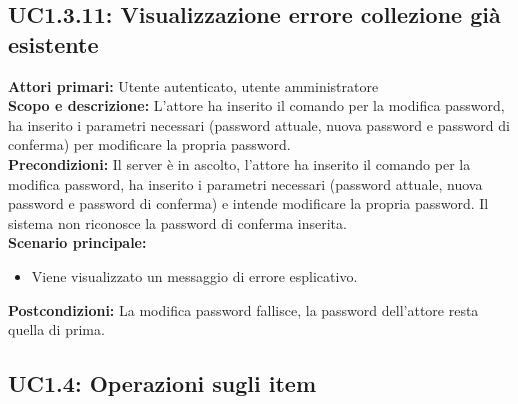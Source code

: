\documentclass{scalatekids-article}
\begin{document}
\subsection{UC1.3.11: Visualizzazione errore collezione già esistente}

\textbf{Attori primari:} Utente autenticato, utente amministratore\\
\textbf{Scopo e descrizione:}
L'attore ha inserito il comando per la modifica password, ha inserito i parametri necessari (password attuale, nuova password e password di conferma) per modificare la propria password.\\
\textbf{Precondizioni:} Il server è in ascolto, l'attore ha inserito il comando per la modifica password, ha inserito i parametri necessari (password attuale, nuova password e password di conferma) e intende modificare la propria password. Il sistema non riconosce la password di conferma inserita.\\
\textbf{Scenario principale:}
\begin{itemize}
\item Viene visualizzato un messaggio di errore esplicativo.
\end{itemize}
\textbf{Postcondizioni:} La modifica password fallisce, la password dell'attore resta quella di prima.

\subsection{UC1.4: Operazioni sugli item}
\end{document}
